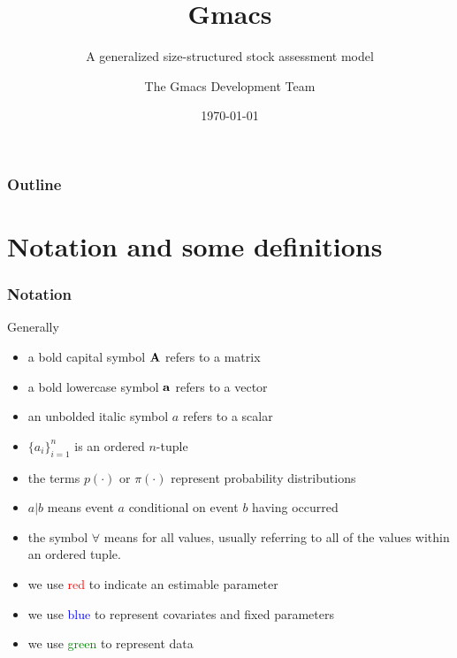 \documentclass{beamer}
\title{Gmacs}
\subtitle{A generalized size-structured stock assessment model}
\author{The Gmacs Development Team}
\date{\today}
\begin{document}

\begin{frame}
\titlepage
\end{frame}


\begin{frame}
\frametitle{Outline}
\tableofcontents
\end{frame}


\section{Notation and some definitions}


\begin{frame}
\frametitle{Notation}
Generally
\begin{itemize}
\item a bold capital symbol ${\bf A}$ refers to a matrix
\item a bold lowercase symbol ${\bf a}$ refers to a vector
\item an unbolded italic symbol $a$ refers to a scalar
\item $\{ a_i \}^n_{i=1}$ is an ordered $n$-tuple
\item the terms $p(\cdot)$ or $\pi(\cdot)$ represent probability
  distributions
\item $a|b$ means event $a$ conditional on event $b$ having occurred
\item the symbol $\forall$ means for all values, usually referring to all of the
  values within an ordered tuple.
\item we use \textcolor{red}{red} to indicate an estimable parameter
\item we use \textcolor{blue}{blue} to represent covariates and fixed parameters
\item we use \textcolor{green}{green} to represent data
\end{itemize}
\end{frame}
\end{document}
